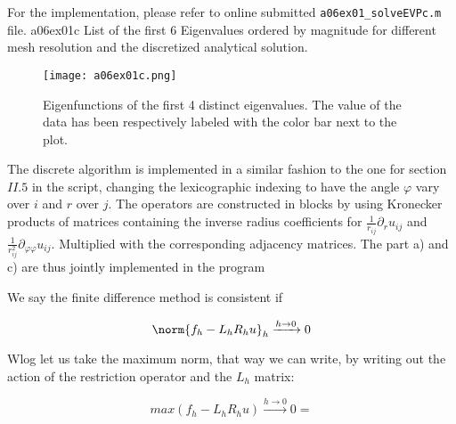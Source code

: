 For the implementation, please refer to online submitted \texttt{a06ex01\_solveEVPc.m} file.
%
\vspace*{2\FigUpperVSpace}
		 {a06ex01c}
		 {List of the first 6 Eigenvalues ordered by magnitude for different mesh resolution and the discretized analytical solution.}
%
\begin{figure}[H]
	\centering
	\texttt{[image: a06ex01c.png]} 
	\caption{Eigenfunctions of the first 4 distinct eigenvalues.
			 The value of the data has been respectively labeled with the color bar next to the plot.}
	\label{fig:a06ex01c}
\end{figure}
%
%

%

%

%


%
The discrete algorithm is implemented in a similar fashion to the one for section $II.5$ in the script, changing the lexicographic indexing to have the angle $\varphi$ vary over $i$ and $r$ over $j$. The operators are constructed in blocks by using Kronecker products of matrices containing the inverse radius coefficients for $\frac{1}{r_{ij}}\partial_{r}u_{ij}$ and $\frac{1}{r_{ij}^2}\partial_{\varphi\varphi}u_{ij}$. Multiplied with the corresponding adjacency matrices. The part a) and c) are thus jointly implemented in the program 

%
We say the finite difference method is consistent if

\begin{equation*}
    \norm{f_h-L_h R_h u}_h \xrightarrow{ h \to 0} 0
\end{equation*}

Wlog let us take the maximum norm, that way we can write, by writing out the action of the restriction operator and the $L_h$ matrix:

\begin{equation*}
    max(f_h-L_hR_hu) \xrightarrow{ h \to 0} 0=
\end{equation*}

